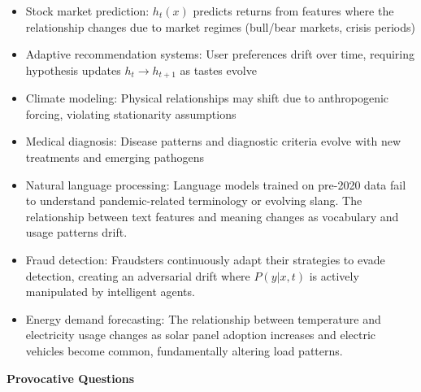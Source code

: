   \begin{itemize}
    \item Stock market prediction: $h_{t}(x)$ predicts returns from
      features where the relationship changes due to market regimes (bull/bear
      markets, crisis periods)

    \item Adaptive recommendation systems: User preferences drift over
      time, requiring hypothesis updates $h_{t}\to h_{t+1}$ as tastes evolve

    \item Climate modeling: Physical relationships may shift due to
      anthropogenic forcing, violating stationarity assumptions

    \item Medical diagnosis: Disease patterns and diagnostic criteria
      evolve with new treatments and emerging pathogens

    \item Natural language processing: Language models trained on pre-2020
      data fail to understand pandemic-related terminology or evolving
      slang. The relationship between text features and meaning changes as
      vocabulary and usage patterns drift.

    \item Fraud detection: Fraudsters continuously adapt their
      strategies to evade detection, creating an adversarial drift where
      $P(y|x, t)$ is actively manipulated by intelligent agents.

    \item Energy demand forecasting: The relationship between
      temperature and electricity usage changes as solar panel adoption
      increases and electric vehicles become common, fundamentally altering
      load patterns.
  \end{itemize}

  \textbf{Provocative Questions}

